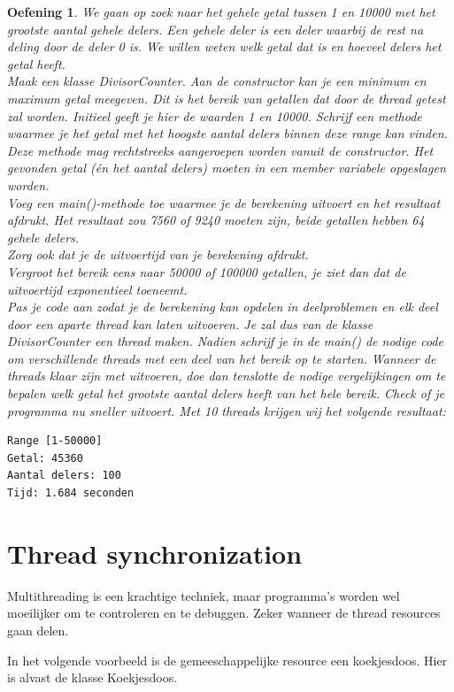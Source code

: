 \documentclass{tstextbook}
\newtheorem{envoefening}{Oefening}[chapter]
\newenvironment{oefening}
               {\begin{boxexercise}\begin{envoefening}}
               {\end{envoefening}\end{boxexercise}}
\begin{document}
\begin{oefening}
We gaan op zoek naar het gehele getal tussen 1 en 10000 met het grootste aantal gehele delers. Een gehele deler is een deler waarbij de rest na deling door de deler 0 is. We willen weten welk getal dat is en hoeveel delers het getal heeft.\\
Maak een klasse DivisorCounter. Aan de constructor kan je een minimum en maximum getal meegeven. Dit is het bereik van getallen dat door de thread getest zal worden.
Initieel geeft je hier de waarden 1 en 10000. Schrijf een methode waarmee je het getal met het hoogste aantal delers binnen deze range kan vinden. Deze methode mag rechtstreeks aangeroepen worden vanuit de constructor.
Het gevonden getal (én het aantal delers) moeten in een member variabele opgeslagen worden.\\
Voeg  een main()-methode toe waarmee je de berekening uitvoert en het resultaat afdrukt.
Het resultaat zou 7560 of 9240 moeten zijn, beide getallen hebben 64 gehele delers.\\
Zorg ook dat je de uitvoertijd van je berekening afdrukt.\\ 
Vergroot het bereik eens naar 50000 of 100000 getallen, je ziet dan dat de uitvoertijd exponentieel toeneemt.\\
Pas je code aan zodat je de berekening kan opdelen in deelproblemen en elk deel door een aparte thread kan laten uitvoeren. Je zal dus van de klasse DivisorCounter een thread maken.
Nadien schrijf je in de main() de nodige code om verschillende threads met een deel van het bereik op te starten. Wanneer de threads klaar zijn met uitvoeren, doe dan tenslotte de nodige vergelijkingen om te bepalen welk getal het grootste aantal delers heeft van het hele bereik.
Check of je programma nu sneller uitvoert. Met 10 threads krijgen wij het volgende resultaat:
\begin{verbatim}
Range [1-50000]
Getal: 45360
Aantal delers: 100
Tijd: 1.684 seconden
\end{verbatim}
\end{oefening}

\section{Thread synchronization}
Multithreading is een krachtige techniek, maar programma's worden wel moeilijker om te controleren en te debuggen. Zeker wanneer de thread resources gaan delen. 

In het volgende voorbeeld is de gemeeschappelijke resource een koekjesdoos.
Hier is alvast de klasse Koekjesdoos.
\end{document}
